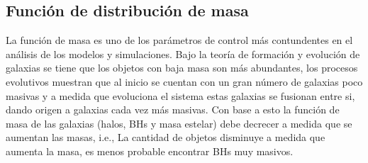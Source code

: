     \subsection{ Función de distribución de masa}
    \label{subsec: funcion de masa}
La función de masa es uno de los parámetros de control más contundentes en el análisis de los modelos y simulaciones. Bajo la teoría de formación y evolución de galaxias se tiene que los objetos con baja masa son más abundantes, los procesos evolutivos muestran que al inicio se cuentan con un gran número de galaxias poco masivas y a medida que evoluciona el sistema estas galaxias se fusionan entre si, dando origen a galaxias cada vez más masivas. 
Con base a esto la función de masa de las galaxias (halos, BHs y masa estelar) debe decrecer a medida que se aumentan las masas, i.e., La cantidad de objetos disminuye a medida que aumenta la masa, es menos probable encontrar BHs muy masivos.
%
